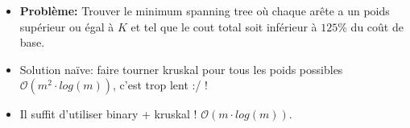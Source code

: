 \begin{frame}
    \frametitle{\problemtitle}
    \begin{itemize}
        \item<+-> \textbf{Problème:} Trouver le minimum spanning tree où chaque arête a un poids supérieur ou égal à $K$ et tel que le cout total soit inférieur à $125\%$ du coût de base.
        \item<+-> Solution na\"ive: faire tourner kruskal pour tous les poids possibles $\mathcal O(m^2\cdot log(m))$, c'est trop lent :/ !
        \item<+-> Il suffit d'utiliser binary + kruskal ! $\mathcal O(m \cdot log(m))$.
    \end{itemize}
\end{frame}
